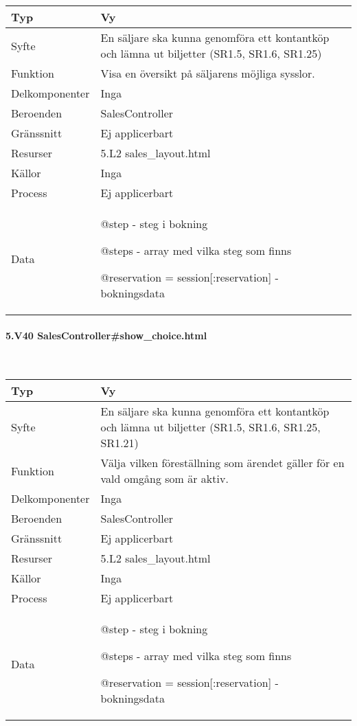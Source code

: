 \documentclass[a4paper, twoside, 11pt, titlepage]{article}
\begin{document}
			\begin {table} [ht] \begin{tabular} {  p{3.5cm} p{9.6cm} }
				\hline
				{Typ} & {Vy} \\
				\hline
				{Syfte} & {En säljare ska kunna genomföra ett kontantköp och lämna ut biljetter (SR1.5, SR1.6, SR1.25)} \\
				\hline
				{Funktion} & {Visa en översikt på säljarens möjliga sysslor.} \\
				\hline
				{Delkomponenter} & {Inga} \\
				\hline
				{Beroenden} & {SalesController} \\
				\hline
				{Gränssnitt} & {Ej applicerbart} \\
				\hline
				{Resurser} & {5.L2 sales\_layout.html} \\
				\hline
				{Källor} & {Inga} \\
				\hline
				{Process} & {Ej applicerbart} \\
				\hline
				{Data} & {@step - steg i bokning

@steps - array med vilka steg som finns

@reservation = session[:reservation] - bokningsdata} \\
				\hline
			\end{tabular} \end{table} \FloatBarrier


			\paragraph{5.V40 SalesController\#show\_choice.html}\

			\begin {table} [ht] \begin{tabular} {  p{3.5cm} p{9.6cm} }
				\hline
				{Typ} & {Vy} \\
				\hline
				{Syfte} & {En säljare ska kunna genomföra ett kontantköp och lämna ut biljetter (SR1.5, SR1.6, SR1.25, SR1.21)} \\
				\hline
				{Funktion} & {Välja vilken föreställning som ärendet gäller för en vald omgång som är aktiv.} \\
				\hline
				{Delkomponenter} & {Inga} \\
				\hline
				{Beroenden} & {SalesController} \\
				\hline
				{Gränssnitt} & {Ej applicerbart} \\
				\hline
				{Resurser} & {5.L2 sales\_layout.html} \\
				\hline
				{Källor} & {Inga} \\
				\hline
				{Process} & {Ej applicerbart} \\
				\hline
				{Data} & {@step - steg i bokning

@steps - array med vilka steg som finns

@reservation = session[:reservation] - bokningsdata} \\
				\hline
			\end{tabular} \end{table} \FloatBarrier
\end{document}
